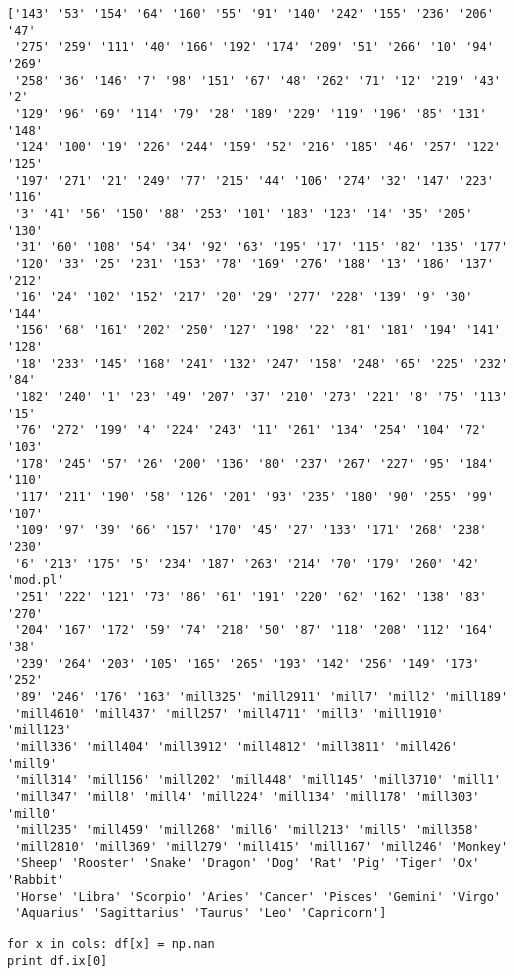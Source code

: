 \documentclass[12pt,fleqn]{article}\usepackage{common}
\begin{document}
\begin{verbatim}
['143' '53' '154' '64' '160' '55' '91' '140' '242' '155' '236' '206' '47'
 '275' '259' '111' '40' '166' '192' '174' '209' '51' '266' '10' '94' '269'
 '258' '36' '146' '7' '98' '151' '67' '48' '262' '71' '12' '219' '43' '2'
 '129' '96' '69' '114' '79' '28' '189' '229' '119' '196' '85' '131' '148'
 '124' '100' '19' '226' '244' '159' '52' '216' '185' '46' '257' '122' '125'
 '197' '271' '21' '249' '77' '215' '44' '106' '274' '32' '147' '223' '116'
 '3' '41' '56' '150' '88' '253' '101' '183' '123' '14' '35' '205' '130'
 '31' '60' '108' '54' '34' '92' '63' '195' '17' '115' '82' '135' '177'
 '120' '33' '25' '231' '153' '78' '169' '276' '188' '13' '186' '137' '212'
 '16' '24' '102' '152' '217' '20' '29' '277' '228' '139' '9' '30' '144'
 '156' '68' '161' '202' '250' '127' '198' '22' '81' '181' '194' '141' '128'
 '18' '233' '145' '168' '241' '132' '247' '158' '248' '65' '225' '232' '84'
 '182' '240' '1' '23' '49' '207' '37' '210' '273' '221' '8' '75' '113' '15'
 '76' '272' '199' '4' '224' '243' '11' '261' '134' '254' '104' '72' '103'
 '178' '245' '57' '26' '200' '136' '80' '237' '267' '227' '95' '184' '110'
 '117' '211' '190' '58' '126' '201' '93' '235' '180' '90' '255' '99' '107'
 '109' '97' '39' '66' '157' '170' '45' '27' '133' '171' '268' '238' '230'
 '6' '213' '175' '5' '234' '187' '263' '214' '70' '179' '260' '42' 'mod.pl'
 '251' '222' '121' '73' '86' '61' '191' '220' '62' '162' '138' '83' '270'
 '204' '167' '172' '59' '74' '218' '50' '87' '118' '208' '112' '164' '38'
 '239' '264' '203' '105' '165' '265' '193' '142' '256' '149' '173' '252'
 '89' '246' '176' '163' 'mill325' 'mill2911' 'mill7' 'mill2' 'mill189'
 'mill4610' 'mill437' 'mill257' 'mill4711' 'mill3' 'mill1910' 'mill123'
 'mill336' 'mill404' 'mill3912' 'mill4812' 'mill3811' 'mill426' 'mill9'
 'mill314' 'mill156' 'mill202' 'mill448' 'mill145' 'mill3710' 'mill1'
 'mill347' 'mill8' 'mill4' 'mill224' 'mill134' 'mill178' 'mill303' 'mill0'
 'mill235' 'mill459' 'mill268' 'mill6' 'mill213' 'mill5' 'mill358'
 'mill2810' 'mill369' 'mill279' 'mill415' 'mill167' 'mill246' 'Monkey'
 'Sheep' 'Rooster' 'Snake' 'Dragon' 'Dog' 'Rat' 'Pig' 'Tiger' 'Ox' 'Rabbit'
 'Horse' 'Libra' 'Scorpio' 'Aries' 'Cancer' 'Pisces' 'Gemini' 'Virgo'
 'Aquarius' 'Sagittarius' 'Taurus' 'Leo' 'Capricorn']
\end{verbatim}


\begin{verbatim}
for x in cols: df[x] = np.nan
print df.ix[0]
\end{verbatim}
\end{document}
